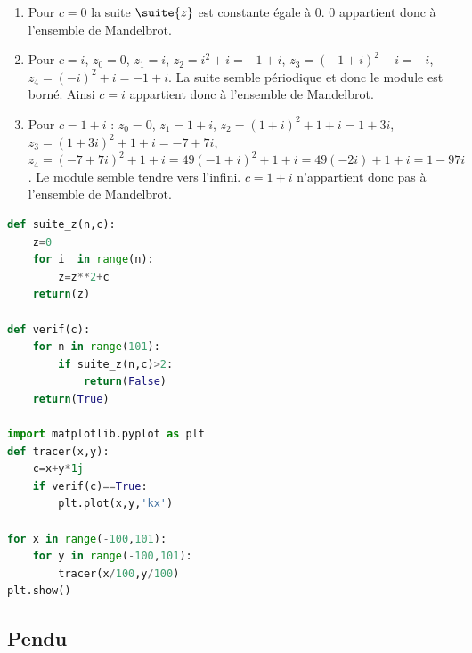 \begin{exercice}
\begin{center}
\end{center}

\end{exercice}


\begin{correction}
\begin{enumerate}
\item Pour $c=0$ la suite $\suite{z}$ est constante égale à $0$. $0$ appartient donc à l'ensemble de Mandelbrot. 
\item Pour $c=i$, $z_0=0$, $z_1=i$, $z_2= i^2+i=-1+i$, $z_3= (-1+i)^2 +i = -i$, $z_4=(-i)^2+i = -1+i$. La suite semble périodique et donc le module est borné. Ainsi $c=i$  appartient donc à l'ensemble de Mandelbrot. 

\item Pour $c=1+i$ : $z_0=0$, $z_1=1+i$, $z_2=(1+i)^2+1+i=1+3i$, $z_3= (1+3i)^2 +1+i = -7+7i$, $z_4=(-7+7i)^2+1+i= 49(-1+i)^2+1+i = 49(-2i) +1+i = 1-97i$. Le module semble tendre vers l'infini. 
$c=1+i$ n'appartient donc pas à l'ensemble de Mandelbrot. 


\end{enumerate}
\begin{lstlisting}[language=Python]
def suite_z(n,c):
    z=0
    for i  in range(n):
        z=z**2+c
    return(z)

def verif(c):
    for n in range(101):
        if suite_z(n,c)>2:
            return(False)
    return(True)

import matplotlib.pyplot as plt
def tracer(x,y):
    c=x+y*1j
    if verif(c)==True:
        plt.plot(x,y,'kx')

for x in range(-100,101):
    for y in range(-100,101):
        tracer(x/100,y/100)
plt.show()

\end{lstlisting}

\end{correction}


\subsection{Pendu}

